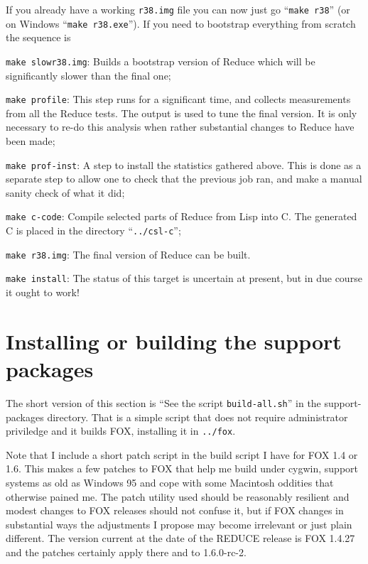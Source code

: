 \documentclass[11pt]{article}
\begin{document}
If you already have a working \verb+r38.img+ file you can now just go 
``\verb+make r38+'' (or on Windows ``\verb+make r38.exe+''). If you need
to bootstrap everything from scratch the sequence is
\begin{description}
\item{\verb+make slowr38.img+:} Builds a bootstrap version of Reduce which
will be significantly slower than the final one;
\item{\verb+make profile+:} This step runs for a significant time, and collects
measurements from all the Reduce tests. The output is used to tune the
final version. It is only necessary to re-do this analysis when rather
substantial changes to Reduce have been made;
\item{\verb+make prof-inst+:} A step to install the statistics gathered above.
This is done as a separate step to allow one to check that the previous
job ran, and make a manual sanity check of what it did;
\item{\verb+make c-code+:} Compile selected parts of Reduce from Lisp into C.
The generated C is placed in the directory ``\verb+../csl-c+'';
\item{\verb+make r38.img+:} The final version of Reduce can be built.
\item{\verb+make install+:} The status of this target is uncertain at present,
but in due course it ought to work!
\end{description}



\section{Installing or building the support packages}
The short version of this section is ``See the script
\verb+build-all.sh+'' in the support-packages directory. That is
a simple script that does not require administrator priviledge and it
builds FOX, installing it in \verb+../fox+.

Note that I include a short patch script in the build script I have
for FOX 1.4 or 1.6. This makes a few patches to FOX that help me build under
cygwin, support systems as old as Windows 95 and cope with some Macintosh
oddities that otherwise pained me. The patch utility used should be
reasonably resilient and modest changes to FOX releases should not confuse
it, but if FOX changes in substantial ways the adjustments I propose may
become irrelevant or just plain different. The version current at the
date of the REDUCE release is FOX 1.4.27 and the patches certainly apply
there and to 1.6.0-rc-2.
\end{document}
